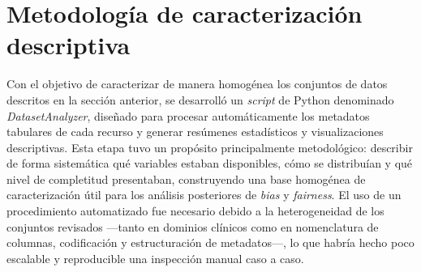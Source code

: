 \begin{table}[htbp]
\centering
\caption{Parámetros de adquisición reportados en los datasets revisados}
\label{tab:acquisition-all-datasets}
\renewcommand{\arraystretch}{1.15}
\end{table}

\section{Metodología de caracterización descriptiva}

Con el objetivo de caracterizar de manera homogénea los conjuntos de datos descritos en la sección anterior, se desarrolló un \textit{script} de Python denominado \textit{DatasetAnalyzer}, diseñado para procesar automáticamente los metadatos tabulares de cada recurso y generar resúmenes estadísticos y visualizaciones descriptivas. Esta etapa tuvo un propósito principalmente metodológico: describir de forma sistemática qué variables estaban disponibles, cómo se distribuían y qué nivel de completitud presentaban, construyendo una base homogénea de caracterización útil para los análisis posteriores de \textit{bias} y \textit{fairness}. El uso de un procedimiento automatizado fue necesario debido a la heterogeneidad de los conjuntos revisados —tanto en dominios clínicos como en nomenclatura de columnas, codificación y estructuración de metadatos—, lo que habría hecho poco escalable y reproducible una inspección manual caso a caso.


